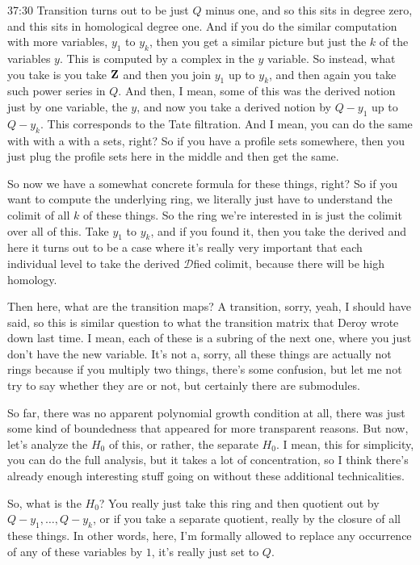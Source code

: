 \begin{unfinished}{37:30}
Transition turns out to be just $Q$ minus one, and so this sits in degree zero, and this sits in homological degree one. And if you do the similar computation with more variables, $y_1$ to $y_k$, then you get a similar picture but just the $k$ of the variables $y$. This is computed by a complex in the $y$ variable. So instead, what you take is you take $\mathbf Z$ and then you join $y_1$ up to $y_k$, and then again you take such power series in $Q$. And then, I mean, some of this was the derived notion just by one variable, the $y$, and now you take a derived notion by $Q - y_1$ up to $Q - y_k$. This corresponds to the Tate filtration. And I mean, you can do the same with with a with a sets, right? So if you have a profile sets somewhere, then you just plug the profile sets here in the middle and then get the same.

So now we have a somewhat concrete formula for these things, right? So if you want to compute the underlying ring, we literally just have to understand the colimit of all $k$ of these things. So the ring we're interested in is just the colimit over all of this. Take $y_1$ to $y_k$, and if you found it, then you take the derived and here it turns out to be a case where it's really very important that each individual level to take the derived $\mathcal{D}$fied colimit, because there will be high homology.

Then here, what are the transition maps? A transition, sorry, yeah, I should have said, so this is similar question to what the transition matrix that Deroy wrote down last time. I mean, each of these is a subring of the next one, where you just don't have the new variable. It's not a, sorry, all these things are actually not rings because if you multiply two things, there's some confusion, but let me not try to say whether they are or not, but certainly there are submodules.

So far, there was no apparent polynomial growth condition at all, there was just some kind of boundedness that appeared for more transparent reasons. But now, let's analyze the $H_0$ of this, or rather, the separate $H_0$. I mean, this for simplicity, you can do the full analysis, but it takes a lot of concentration, so I think there's already enough interesting stuff going on without these additional technicalities.

So, what is the $H_0$? You really just take this ring and then quotient out by $Q - y_1, \dots, Q - y_k$, or if you take a separate quotient, really by the closure of all these things. In other words, here, I'm formally allowed to replace any occurrence of any of these variables by $1$, it's really just set to $Q$.


\end{unfinished}
